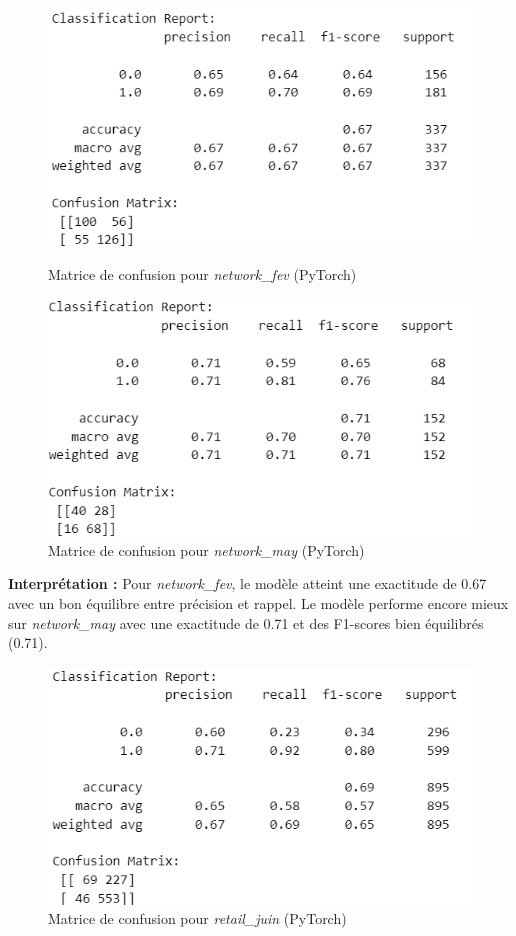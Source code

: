 \begin{figure}[H]
    \centering
    \begin{minipage}{0.45\linewidth}
        \centering
        \includegraphics[width=1\linewidth]{capture_modele_25.png}
        \caption{Matrice de confusion pour \textit{network\_fev} (PyTorch)}
    \end{minipage}\hfill
    \begin{minipage}{0.45\linewidth}
        \centering
        \includegraphics[width=1\linewidth]{capture_modele_26.png}
        \caption{Matrice de confusion pour \textit{network\_may} (PyTorch)}
    \end{minipage}
\end{figure}

\textbf{Interprétation :} Pour \textit{network\_fev}, le modèle atteint une exactitude de 0.67 avec un bon équilibre entre précision et rappel. Le modèle performe encore mieux sur \textit{network\_may} avec une exactitude de 0.71 et des F1-scores bien équilibrés (0.71).

\begin{figure}[H]
    \centering
    \includegraphics[width=0.6\linewidth]{capture_modele_27.png}
    \caption{Matrice de confusion pour \textit{retail\_juin} (PyTorch)}
\end{figure}

